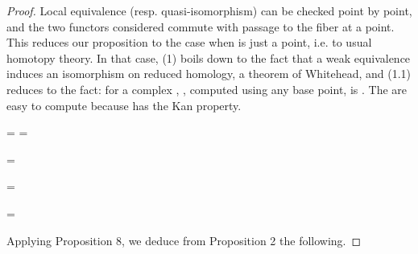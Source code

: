 \documentclass[11pt,a4paper]{article}
\theoremstyle{plain}
\theoremstyle{definition}
\begin{document}
\begin{proof} Local equivalence (resp. quasi-isomorphism) can be checked point by point,
and the two functors considered commute with passage to the fiber at a point. This
reduces our proposition to the case when is just a point, i.e. to usual homotopy
theory. In that case, (1) boils down to the fact that a weak equivalence induces an
isomorphism on reduced homology, a theorem of Whitehead, and (1.1) reduces to
the fact: for a complex , 
, computed using any base point, is 
. The
are
easy
to
compute
because
has
the
Kan
property.





=   =

  =

 =

=

Applying Proposition 8, we deduce from Proposition 2 the following.
\end{proof}
\end{document}
